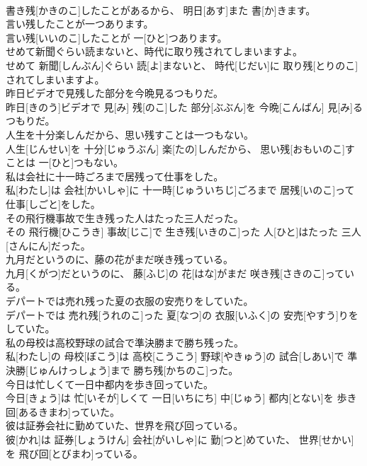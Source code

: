 \documentclass[8pt]{extreport}
\begin{document}
\begin{CJK}{UTF8}{min}
\\	書き残[かきのこ]したことがあるから、 明日[あす]また 書[か]きます。
\\	言い残したことが一つあります。	
\\	言い残[いいのこ]したことが 一[ひと]つあります。
\\	せめて新聞ぐらい読まないと、時代に取り残されてしまいますよ。	
\\	せめて 新聞[しんぶん]ぐらい 読[よ]まないと、 時代[じだい]に 取り残[とりのこ]されてしまいますよ。
\\	昨日ビデオで見残した部分を今晩見るつもりだ。	
\\	昨日[きのう]ビデオで 見[み] 残[のこ]した 部分[ぶぶん]を 今晩[こんばん] 見[み]るつもりだ。
\\	人生を十分楽しんだから、思い残すことは一つもない。	
\\	人生[じんせい]を 十分[じゅうぶん] 楽[たの]しんだから、 思い残[おもいのこ]すことは 一[ひと]つもない。
\\	私は会社に十一時ごろまで居残って仕事をした。	
\\	私[わたし]は 会社[かいしゃ]に 十一時[じゅういちじ]ごろまで 居残[いのこ]って 仕事[しごと]をした。
\\	その飛行機事故で生き残った人はたった三人だった。	
\\	その 飛行機[ひこうき] 事故[じこ]で 生き残[いきのこ]った 人[ひと]はたった 三人[さんにん]だった。
\\	九月だというのに、藤の花がまだ咲き残っている。	
\\	九月[くがつ]だというのに、 藤[ふじ]の 花[はな]がまだ 咲き残[さきのこ]っている。
\\	デパートでは売れ残った夏の衣服の安売りをしていた。	
\\	デパートでは 売れ残[うれのこ]った 夏[なつ]の 衣服[いふく]の 安売[やすう]りをしていた。
\\	私の母校は高校野球の試合で準決勝まで勝ち残った。	
\\	私[わたし]の 母校[ぼこう]は 高校[こうこう] 野球[やきゅう]の 試合[しあい]で 準決勝[じゅんけっしょう]まで 勝ち残[かちのこ]った。
\\	今日は忙しくて一日中都内を歩き回っていた。	
\\	今日[きょう]は 忙[いそが]しくて 一日[いちにち] 中[じゅう] 都内[とない]を 歩き回[あるきまわ]っていた。
\\	彼は証券会社に勤めていた、世界を飛び回っている。	
\\	彼[かれ]は 証券[しょうけん] 会社[がいしゃ]に 勤[つと]めていた、 世界[せかい]を 飛び回[とびまわ]っている。

\end{CJK}
\end{document}
